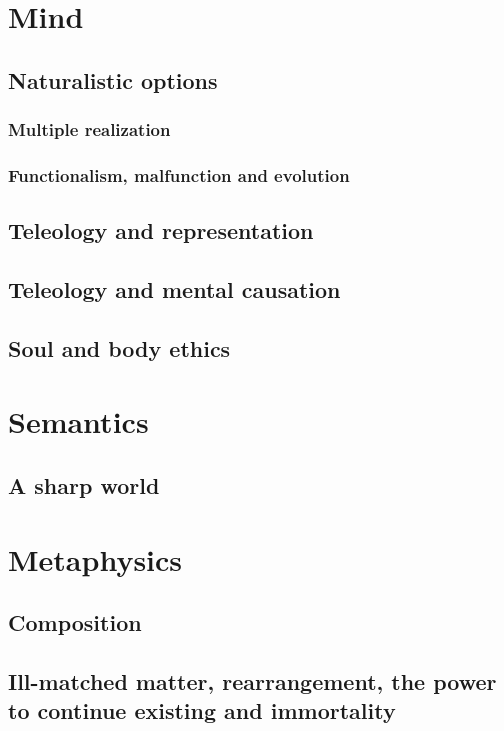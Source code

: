 \def\mychapter{VI}

\chapter{Mind}\label{ch:mind}
\section{Naturalistic options}
\subsection{Multiple realization}
\subsection{Functionalism, malfunction and evolution}
\section{Teleology and representation}
\section{Teleology and mental causation}
\section{Soul and body ethics}
\chaptertail 

\def\mychapter{VII}

\chapter{Semantics}\label{ch:semantics}
\section{A sharp world}
\chaptertail

\def\mychapter{VIII}

\chapter{Metaphysics}\label{ch:metaphysics}
\section{Composition}
\section{Ill-matched matter, rearrangement, the power to continue existing and immortality}
